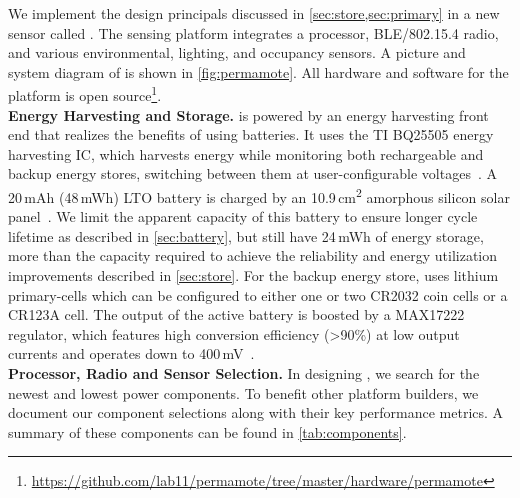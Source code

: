 We implement the design principals discussed in \cref{sec:store,sec:primary}
in a new sensor called \name. The \name sensing platform
integrates a processor, BLE/802.15.4 radio, and various environmental, lighting,
and occupancy sensors. A picture
and system diagram of \name is shown in \cref{fig:permamote}. All hardware
and software for the platform is open source\footnote{\url{https://github.com/lab11/permamote/tree/master/hardware/permamote}}.\\

\vspace{-6pt}
\noindent
\textbf{Energy Harvesting and Storage.}
\name is powered by an energy harvesting front end that realizes the benefits
of using batteries. It uses the TI BQ25505 energy harvesting IC, which
harvests energy while monitoring both
rechargeable and backup energy stores,
switching between them at user-configurable voltages~\cite{bq25505}. A
20\,mAh (48\,mWh) LTO battery is charged by an 10.9\,cm\textsuperscript{2} amorphous
silicon solar panel~\cite{LTODatasheet, LTODatasheet2}. We limit the apparent
capacity of this battery to ensure
longer cycle lifetime as described in \cref{sec:battery}, but still have 24\,mWh of
energy storage, more than the capacity required to achieve the reliability and energy utilization
improvements described in \cref{sec:store}. For the backup energy
store, \name uses lithium primary-cells which can be configured to either one or two CR2032 coin
cells or a CR123A cell.
The output of the active battery
is boosted by a MAX17222 regulator, which features high conversion efficiency
(>90\%) at low output currents and operates down to 400\,mV~\cite{max17222}.\\

\vspace{-6pt}
\noindent
\textbf{Processor, Radio and Sensor Selection.}
In designing \name, we search for the newest and lowest power components.
To benefit other
platform builders, we document our component selections
along with their key performance metrics. A summary of these
components can be found in \cref{tab:components}.

